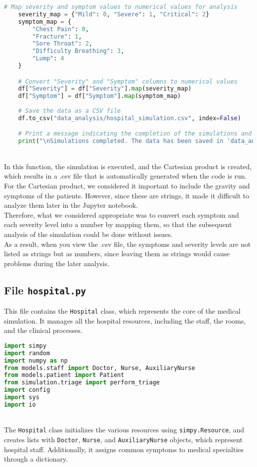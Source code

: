\documentclass[a4paper,12pt]{article}
\begin{document}
\begin{lstlisting}[language=Python]
    # Map severity and symptom values to numerical values for analysis
    severity_map = {"Mild": 0, "Severe": 1, "Critical": 2}
    symptom_map = {
        "Chest Pain": 0,
        "Fracture": 1,
        "Sore Throat": 2,
        "Difficulty Breathing": 3,
        "Lump": 4
    }

    # Convert "Severity" and "Symptom" columns to numerical values
    df["Severity"] = df["Severity"].map(severity_map)
    df["Symptom"] = df["Symptom"].map(symptom_map)
    
    # Save the data as a CSV file
    df.to_csv("data_analysis/hospital_simulation.csv", index=False)

    # Print a message indicating the completion of the simulations and data saving
    print("\nSimulations completed. The data has been saved in 'data_analysis/hospital_simulation.csv'")

\end{lstlisting}
\\
In this function, the simulation is executed, and the Cartesian product is created, which results in a .csv file that is automatically generated when the code is run. 
\\
For the Cartesian product, we considered it important to include the gravity and symptoms of the patients. However, since these are strings, it made it difficult to analyze them later in the Jupyter notebook. 
\\
Therefore, what we considered appropriate was to convert each symptom and each severity level into a number by mapping them, so that the subsequent analysis of the simulation could be done without issues. 
\\
As a result, when you view the .csv file, the symptoms and severity levels are not listed as strings but as numbers, since leaving them as strings would cause problems during the later analysis.


\subsection{File \texttt{hospital.py}}
This file contains the \texttt{Hospital} class, which represents the core of the medical simulation. It manages all the hospital resources, including the staff, the rooms, and the clinical processes.

\begin{lstlisting}[language=Python]
import simpy
import random
import numpy as np
from models.staff import Doctor, Nurse, AuxiliaryNurse
from models.patient import Patient
from simulation.triage import perform_triage
import config 
import sys
import io

\end{lstlisting}
\\
The \texttt{Hospital} class initializes the various resources using \texttt{simpy.Resource}, and creates lists with \texttt{Doctor}, \texttt{Nurse}, and \texttt{AuxiliaryNurse} objects, which represent hospital staff. Additionally, it assigns common symptoms to medical specialties through a dictionary.
\end{document}
